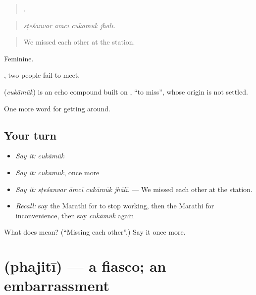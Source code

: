 \begin{quote}
   .
\end{quote}

\begin{quote}
\emph{sṭeśanvar āmcī cukāmūk jhālī.}
\end{quote}

\begin{quote}
We missed each other at the station.
\end{quote}

Feminine.

 , two people fail to meet.

\begin{cousinweb}
\textbf{} (\emph{cukāmūk}) is an echo compound built on \textbf{}, \textquotedblleft{}to miss\textquotedblright{}, whose origin is not settled.
\end{cousinweb}

\begin{grammarlens}[title={What you've built}]
One more word for getting around.
\end{grammarlens}

\subsection*{Your turn}
\begin{itemize}
\raggedright
  \item \emph{Say it:} \emph{cukāmūk}
  \item \emph{Say it:} \emph{cukāmūk}, once more
  \item \emph{Say it:} \emph{sṭeśanvar āmcī cukāmūk jhālī.} — We missed each other at the station.
  \item \emph{Recall:} say the Marathi for to stop working, then the Marathi for inconvenience, then say \emph{cukāmūk} again
\end{itemize}

\begin{tcolorbox}[breakable,colback=teal!4,colframe=teal!35!black,title={Before you move on}]
What does  mean? (\textquotedblleft{}Missing each other\textquotedblright{}.) Say it once more.
\end{tcolorbox}
\section[\texorpdfstring{\mr{फजिती} (phajitī)}{फजिती (phajitī)}]{ (phajitī) — a fiasco; an embarrassment}

